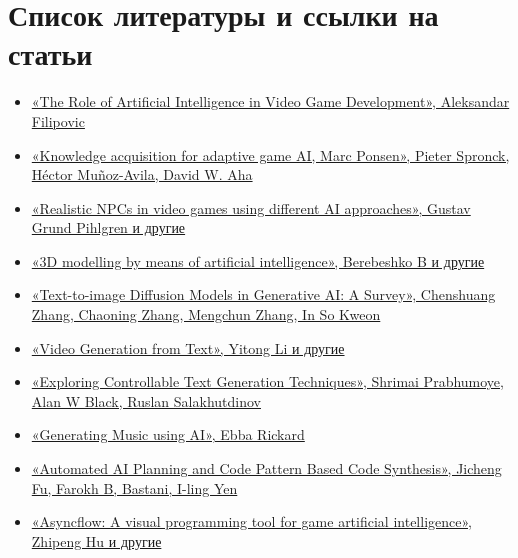 \documentclass[14pt]{article}
\begin{document}
\section{Список литературы и ссылки на статьи}
\begin{itemize}
 \item \href{https://www.researchgate.net/publication/375488989_The_Role_of_Artificial_Intelligence_in_Video_Game_Development}{«The Role of Artificial Intelligence in Video Game Development», Aleksandar Filipovic}
 \item \href{https://www.sciencedirect.com/science/article/pii/S0167642307000548}{«Knowledge acquisition for adaptive game AI, Marc Ponsen», Pieter Spronck, Héctor Muñoz-Avila, David W. Aha} 
 \item \href{https://odr.chalmers.se/items/f2c23a1d-b9a9-4148-b92f-183907970e2d}{«Realistic NPCs in video games using different AI approaches», Gustav Grund Pihlgren и другие}
 \item \href{https://www.jatit.org/volumes/Vol99No6/5Vol99No6.pdf}{«3D modelling by means of artificial intelligence», Berebeshko B и другие}
 \item \href{https://arxiv.org/abs/2303.07909}{«Text-to-image Diffusion Models in Generative AI: A Survey», Chenshuang Zhang, Chaoning Zhang, Mengchun Zhang, In So Kweon}
 \item \href{https://ojs.aaai.org/index.php/AAAI/article/view/12233}{«Video Generation from Text», Yitong Li и другие}
 \item \href{https://arxiv.org/abs/2005.01822}{«Exploring Controllable Text Generation Techniques», Shrimai Prabhumoye, Alan W Black, Ruslan Salakhutdinov}
 \item \href{https://lup.lub.lu.se/luur/download?func=downloadFile&recordOId=9093922&fileOId=9093927}{«Generating Music using AI», Ebba Rickard}
 \item \href{https://ieeexplore.ieee.org/abstract/document/4031942?casa_token=WF7oQXaCYSUAAAAA:xLmkqoGgGjGWYHPN3cZaEISoyrqlLnhMD1CdkVGuVNtLOJLL1fdwSEyDPw5AcKUsFKoIep8Jx_bkEQ}{«Automated AI Planning and Code Pattern Based Code Synthesis», Jicheng Fu, Farokh B, Bastani, I-ling Yen}
 \item \href{https://www.sciencedirect.com/science/article/pii/S2468502X21000498}{«Asyncflow: A visual programming tool for game artificial intelligence», Zhipeng Hu и другие}
\end{itemize}
\end{document}

